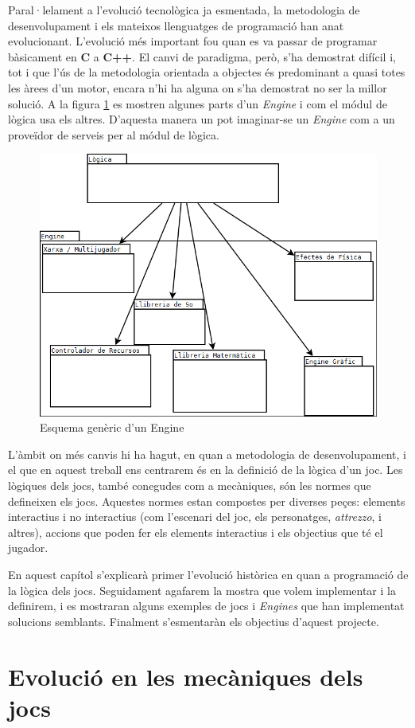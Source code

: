 Paral·lelament a l'evolució tecnològica ja esmentada, la metodologia de desenvolupament i els mateixos llenguatges de programació han anat evolucionant. L'evolució més important fou quan es va passar de programar bàsicament en {\bf C} a {\bf C++}. El canvi de paradigma, però, s'ha demostrat difícil i, tot i que l'ús de la metodologia orientada a objectes és predominant a quasi totes les àrees d'un motor, encara n'hi ha alguna on s'ha demostrat no ser la millor solució. A la figura \ref{fig:EsquemaEngine} es mostren algunes parts d'un {\em Engine} i com el módul de lògica usa els altres. D'aquesta manera un pot imaginar-se un {\em Engine} com a un proveïdor de serveis per al módul de lògica.


\begin{figure}
  \centering
  \includegraphics[width=0.58\linewidth]{./img/EsquemaEngine.png}
  \caption{Esquema genèric d'un Engine \label{fig:EsquemaEngine}}
\end{figure}

L'àmbit on més canvis hi ha hagut, en quan a metodologia de desenvolupament, i el que en aquest treball ens centrarem és en la definició de la lògica d'un joc. Les lògiques dels jocs, també conegudes com a mecàniques, són les normes que defineixen els jocs. Aquestes normes estan compostes per diverses peçes: elements interactius i no interactius (com l'escenari del joc, els personatges, {\em attrezzo}, i altres), accions que poden fer els elements interactius i els objectius que té el jugador.

En aquest capítol s'explicarà primer l'evolució històrica en quan a programació de la lògica dels jocs. Seguidament agafarem la mostra que volem implementar i la definirem, i es mostraran alguns exemples de jocs i {\em Engines} que han implementat solucions semblants. Finalment s'esmentaràn els objectius d'aquest projecte.

\section{Evolució en les mecàniques dels jocs}

